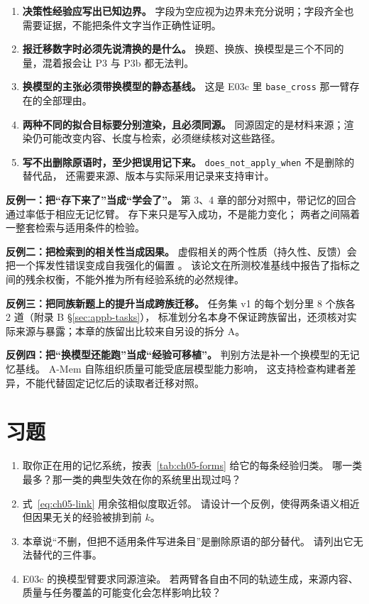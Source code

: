 \begin{enumerate}
  \item \textbf{决策性经验应写出已知边界。}
        字段为空应视为边界未充分说明；字段齐全也需要证据，不能把条件文字当作正确性证明。
  \item \textbf{报迁移数字时必须先说清换的是什么。}
        换题、换族、换模型是三个不同的量，混着报会让 P3 与 P3b 都无法判。
  \item \textbf{换模型的主张必须带换模型的静态基线。}
        这是 E03c 里 \texttt{base\_cross} 那一臂存在的全部理由。
  \item \textbf{两种不同的拟合目标要分别渲染，且必须同源。}
        同源固定的是材料来源；渲染仍可能改变内容、长度与检索，必须继续核对这些路径。
  \item \textbf{写不出删除原语时，至少把误用记下来。}
        \texttt{does\_not\_apply\_when} 不是删除的替代品，
        还需要来源、版本与实际采用记录来支持审计。
\end{enumerate}

\begin{pitfallbox}
\textbf{反例一：把``存下来了''当成``学会了''。}
第 3、4 章的部分对照中，带记忆的回合通过率低于相应无记忆臂。
存下来只是写入成功，不是能力变化；
两者之间隔着一整套检索与适用条件的检验。

\textbf{反例二：把检索到的相关性当成因果。}
虚假相关的两个性质（持久性、反馈）会把一个挥发性错误变成自我强化的偏置
\cite{trap-trajectory-2605}。
该论文在所测校准基线中报告了指标之间的残余权衡，不能外推为所有经验系统的必然规律。

\textbf{反例三：把同族新题上的提升当成跨族迁移。}
任务集 v1 的每个划分里 8 个族各 2 道（附录 B §\ref{sec:appb-tasks}），
标准划分名本身不保证跨族留出，还须核对实际来源与暴露；本章的族留出比较来自另设的拆分 A。

\textbf{反例四：把``换模型还能跑''当成``经验可移植''。}
判别方法是补一个换模型的无记忆基线。
A-Mem 自陈组织质量可能受底层模型能力影响\cite{amem-2502}，
这支持检查构建者差异，不能代替固定记忆后的读取者迁移对照。
\end{pitfallbox}

\section*{习题}
\begin{enumerate}[label=5-\arabic*.,ref=5-\arabic*]
  \item\label{ex:ch05-1} 取你正在用的记忆系统，按表~\ref{tab:ch05-forms} 给它的每条经验归类。
        哪一类最多？那一类的典型失效在你的系统里出现过吗？
  \item\label{ex:ch05-2} 式~\eqref{eq:ch05-link} 用余弦相似度取近邻。
        请设计一个反例，使得两条语义相近但因果无关的经验被排到前 $k$。
  \item\label{ex:ch05-3} 本章说``不删，但把不适用条件写进条目''是删除原语的部分替代。
        请列出它无法替代的三件事。
  \item\label{ex:ch05-4} E03c 的换模型臂要求同源渲染。
        若两臂各自由不同的轨迹生成，来源内容、质量与任务覆盖的可能变化会怎样影响比较？
\end{enumerate}

